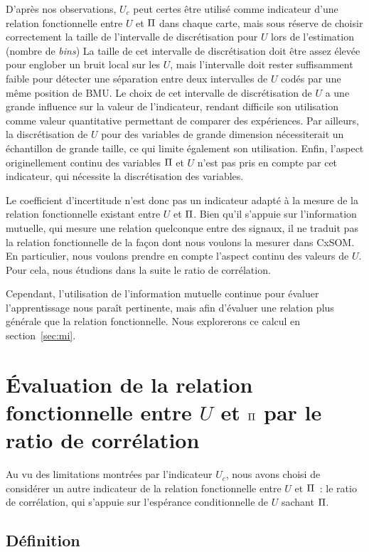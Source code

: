 \documentclass[../main]{subfiles}
\begin{document}
D'après nos observations, $U_c$ peut certes être utilisé comme indicateur d'une relation fonctionnelle entre $U$ et $\Pi$ dans chaque carte, mais sous réserve de choisir correctement la taille de l'intervalle de discrétisation pour $U$ lors de l'estimation (nombre de \emph{bins})
La taille de cet intervalle de discrétisation doit être assez élevée pour englober un bruit local sur les $U$, mais l'intervalle doit rester suffisamment faible pour détecter une séparation entre deux intervalles de $U$ codés par une même position de BMU.
Le choix de cet intervalle de discrétisation de $U$ a une grande influence sur la valeur de l'indicateur, rendant difficile son utilisation comme valeur quantitative permettant de comparer des expériences.
Par ailleurs, la discrétisation de $U$ pour des variables de grande dimension nécessiterait un échantillon de grande taille, ce qui limite également son utilisation.
Enfin, l'aspect originellement continu des variables $\Pi$ et $U$ n'est pas pris en compte par cet indicateur, qui nécessite la discrétisation des variables.

Le coefficient d'incertitude n'est donc pas un indicateur adapté à la mesure de la relation fonctionnelle existant entre $U$ et $\Pi$. Bien qu'il s'appuie sur l'information mutuelle, qui mesure une relation quelconque entre des signaux, il ne traduit pas la relation fonctionnelle de la façon dont nous voulons la mesurer dans CxSOM. En particulier, nous voulons prendre en compte l'aspect continu des valeurs de $U$. Pour cela, nous étudions dans la suite le ratio de corrélation.

Cependant, l'utilisation de l'information mutuelle continue pour évaluer l'apprentissage nous paraît pertinente, mais afin d'évaluer une relation plus générale que la relation fonctionnelle.
Nous explorerons ce calcul en section~\ref{sec:mi}.

\section{\'Evaluation de la relation fonctionnelle entre $U$ et $\Pi$ par le ratio de corrélation}

Au vu des limitations montrées par l'indicateur $U_c$, nous avons choisi de considérer un autre indicateur de la relation fonctionnelle entre $U$ et $\Pi$~: le ratio de corrélation, qui s'appuie sur l'espérance conditionnelle de $U$ sachant $\Pi$.

\subsection{Définition}
\end{document}
